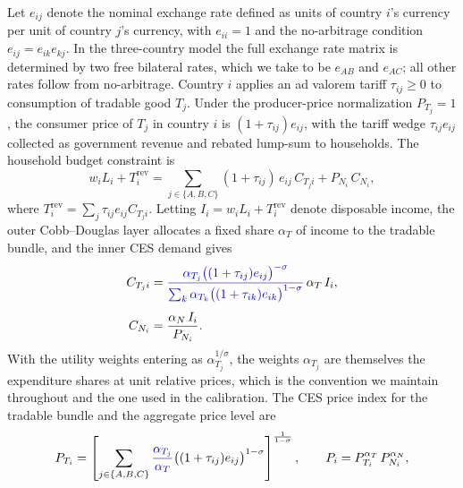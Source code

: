 \documentclass[11pt]{article}
\theoremstyle{plain}
\theoremstyle{remark}
\numberwithin{lemma}{section}
\numberwithin{proposition}{section}
\numberwithin{corollary}{section}
\newcommand{\rev}[1]{{\color{RevBlue}#1}}
\begin{document}
Let $e_{ij}$ denote the nominal exchange rate defined as units of country $i$'s currency per unit of country $j$'s currency, with $e_{ii} = 1$ and the no-arbitrage condition $e_{ij} = e_{ik} e_{kj}$. In the three-country model the full exchange rate matrix is determined by two free bilateral rates, which we take to be $e_{AB}$ and $e_{AC}$; all other rates follow from no-arbitrage. Country $i$ applies an ad valorem tariff $\tau_{ij} \ge 0$ to consumption of tradable good $T_j$. Under the producer-price normalization $P_{T_j} = 1$, the consumer price of $T_j$ in country $i$ is $(1+\tau_{ij})e_{ij}$, with the tariff wedge $\tau_{ij} e_{ij}$ collected as government revenue and rebated lump-sum to households. The household budget constraint is
\begin{equation}
w_i L_i + T_i^{\mathrm{rev}} = \sum_{j \in \{A,B,C\}} (1+\tau_{ij})\, e_{ij}\, C_{T_j i} + P_{N_i}\, C_{N_i},
\label{eq:hh_budget_ces}
\end{equation}
where $T_i^{\mathrm{rev}} = \sum_{j} \tau_{ij} e_{ij} C_{T_j i}$. Letting $I_i = w_i L_i + T_i^{\mathrm{rev}}$ denote disposable income, the outer Cobb--Douglas layer allocates a fixed share $\alpha_T$ of income to the tradable bundle, and the inner CES demand gives
\begin{align}
C_{T_j i} &= \rev{\frac{\alpha_{T_j} \bigl((1+\tau_{ij})e_{ij}\bigr)^{-\sigma}}{\sum_{k} \alpha_{T_k} \bigl((1+\tau_{ik})e_{ik}\bigr)^{1-\sigma}}}\, \alpha_T\, I_i, \label{eq:ces_tradable_demand} \\[4pt]
C_{N_i} &= \frac{\alpha_N\, I_i}{P_{N_i}}. \label{eq:ces_nontradable_demand}
\end{align}
\rev{With the utility weights entering as $\alpha_{T_j}^{1/\sigma}$, the weights $\alpha_{T_j}$ are themselves the expenditure shares at unit relative prices, which is the convention we maintain throughout and the one used in the calibration.} The CES price index for the tradable bundle and the aggregate price level are
\begin{equation}
P_{T_i} = \left[ \sum_{j \in \{A,B,C\}} \rev{\frac{\alpha_{T_j}}{\alpha_T}} \bigl((1+\tau_{ij})e_{ij}\bigr)^{1-\sigma} \right]^{\frac{1}{1-\sigma}}, \qquad P_i = P_{T_i}^{\alpha_T}\, P_{N_i}^{\alpha_N},
\label{eq:price_level_ces}
\end{equation}
\end{document}
